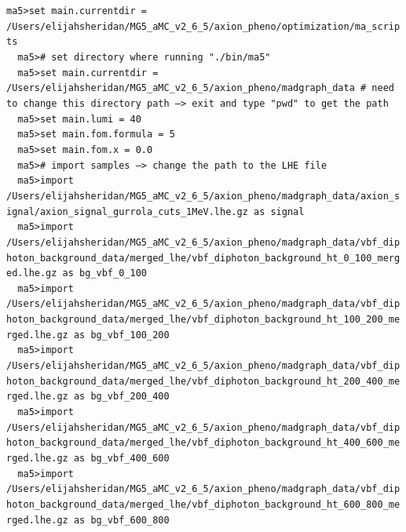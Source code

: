 \documentclass[a4paper, 10pt]{article}
\begin{document}
\texttt{ma5>set main.currentdir = /\-Users/\-elijahsheridan/\-MG5\_aMC\_v2\_6\_5/\-axion\_pheno/\-optimization/\-ma\_scripts\\
}
\texttt{ }\texttt{ }\texttt{ma5>\# set directory where running "./\-bin/\-ma5"\\
}
\texttt{ }\texttt{ }\texttt{ma5>set main.currentdir = /\-Users/\-elijahsheridan/\-MG5\_aMC\_v2\_6\_5/\-axion\_pheno/\-madgraph\_data \# need to change this directory path --> exit and type "pwd" to get the path\\
}
\texttt{ }\texttt{ }\texttt{ma5>set main.lumi = 40\\
}
\texttt{ }\texttt{ }\texttt{ma5>set main.fom.formula = 5\\
}
\texttt{ }\texttt{ }\texttt{ma5>set main.fom.x = 0.0\\
}
\texttt{ }\texttt{ }\texttt{ma5>\# import samples --> change the path to the LHE file\\
}
\texttt{ }\texttt{ }\texttt{ma5>import /\-Users/\-elijahsheridan/\-MG5\_aMC\_v2\_6\_5/\-axion\_pheno/\-madgraph\_data/\-axion\_signal/\-axion\_signal\_gurrola\_cuts\_1MeV.lhe.gz as signal\\
}
\texttt{ }\texttt{ }\texttt{ma5>import /\-Users/\-elijahsheridan/\-MG5\_aMC\_v2\_6\_5/\-axion\_pheno/\-madgraph\_data/\-vbf\_diphoton\_background\_data/\-merged\_lhe/\-vbf\_diphoton\_background\_ht\_0\_100\_merged.lhe.gz as bg\_vbf\_0\_100\\
}
\texttt{ }\texttt{ }\texttt{ma5>import /\-Users/\-elijahsheridan/\-MG5\_aMC\_v2\_6\_5/\-axion\_pheno/\-madgraph\_data/\-vbf\_diphoton\_background\_data/\-merged\_lhe/\-vbf\_diphoton\_background\_ht\_100\_200\_merged.lhe.gz as bg\_vbf\_100\_200\\
}
\texttt{ }\texttt{ }\texttt{ma5>import /\-Users/\-elijahsheridan/\-MG5\_aMC\_v2\_6\_5/\-axion\_pheno/\-madgraph\_data/\-vbf\_diphoton\_background\_data/\-merged\_lhe/\-vbf\_diphoton\_background\_ht\_200\_400\_merged.lhe.gz as bg\_vbf\_200\_400\\
}
\texttt{ }\texttt{ }\texttt{ma5>import /\-Users/\-elijahsheridan/\-MG5\_aMC\_v2\_6\_5/\-axion\_pheno/\-madgraph\_data/\-vbf\_diphoton\_background\_data/\-merged\_lhe/\-vbf\_diphoton\_background\_ht\_400\_600\_merged.lhe.gz as bg\_vbf\_400\_600\\
}
\texttt{ }\texttt{ }\texttt{ma5>import /\-Users/\-elijahsheridan/\-MG5\_aMC\_v2\_6\_5/\-axion\_pheno/\-madgraph\_data/\-vbf\_diphoton\_background\_data/\-merged\_lhe/\-vbf\_diphoton\_background\_ht\_600\_800\_merged.lhe.gz as bg\_vbf\_600\_800\\
}
\end{document}
